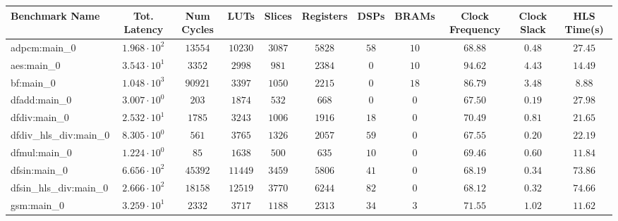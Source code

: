 \begin{tabular}{|l|c|c|c|c|c|c|c|c|c|c|}
\hline
Benchmark Name          & Tot. Latency           & Num Cycles & LUTs      & Slices    & Registers & DSPs    & BRAMs   & Clock Frequency & Clock Slack & HLS Time(s) \\
\hline
adpcm:main\_0           & $ 1.968 \cdot 10^{2} $ & $ 13554  $ & $ 10230 $ & $ 3087  $ & $ 5828  $ & $ 58  $ & $ 10  $ & $ 68.88       $ & $ 0.48    $ & $ 27.45   $ \\
aes:main\_0             & $ 3.543 \cdot 10^{1} $ & $ 3352   $ & $ 2998  $ & $ 981   $ & $ 2384  $ & $ 0   $ & $ 10  $ & $ 94.62       $ & $ 4.43    $ & $ 14.49   $ \\
bf:main\_0              & $ 1.048 \cdot 10^{3} $ & $ 90921  $ & $ 3397  $ & $ 1050  $ & $ 2215  $ & $ 0   $ & $ 18  $ & $ 86.79       $ & $ 3.48    $ & $ 8.88    $ \\
dfadd:main\_0           & $ 3.007 \cdot 10^{0} $ & $ 203    $ & $ 1874  $ & $ 532   $ & $ 668   $ & $ 0   $ & $ 0   $ & $ 67.50       $ & $ 0.19    $ & $ 27.98   $ \\
dfdiv:main\_0           & $ 2.532 \cdot 10^{1} $ & $ 1785   $ & $ 3243  $ & $ 1006  $ & $ 1916  $ & $ 18  $ & $ 0   $ & $ 70.49       $ & $ 0.81    $ & $ 21.65   $ \\
dfdiv\_hls\_div:main\_0 & $ 8.305 \cdot 10^{0} $ & $ 561    $ & $ 3765  $ & $ 1326  $ & $ 2057  $ & $ 59  $ & $ 0   $ & $ 67.55       $ & $ 0.20    $ & $ 22.19   $ \\
dfmul:main\_0           & $ 1.224 \cdot 10^{0} $ & $ 85     $ & $ 1638  $ & $ 500   $ & $ 635   $ & $ 10  $ & $ 0   $ & $ 69.46       $ & $ 0.60    $ & $ 11.84   $ \\
dfsin:main\_0           & $ 6.656 \cdot 10^{2} $ & $ 45392  $ & $ 11449 $ & $ 3459  $ & $ 5806  $ & $ 41  $ & $ 0   $ & $ 68.19       $ & $ 0.34    $ & $ 73.86   $ \\
dfsin\_hls\_div:main\_0 & $ 2.666 \cdot 10^{2} $ & $ 18158  $ & $ 12519 $ & $ 3770  $ & $ 6244  $ & $ 82  $ & $ 0   $ & $ 68.12       $ & $ 0.32    $ & $ 74.66   $ \\
gsm:main\_0             & $ 3.259 \cdot 10^{1} $ & $ 2332   $ & $ 3717  $ & $ 1188  $ & $ 2313  $ & $ 34  $ & $ 3   $ & $ 71.55       $ & $ 1.02    $ & $ 11.62   $ \\

\end{tabular}
